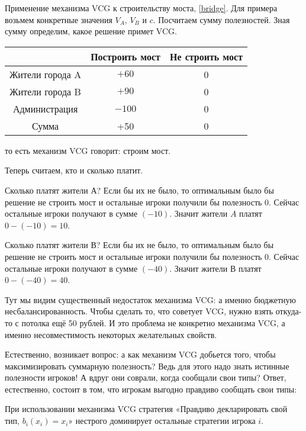 \begin{myex}
Применение механизма VCG к строительству моста, \ref{bridge}. Для примера возьмем конкретные значения $ V_{A} $, $ V_{B} $ и $ c $. Посчитаем сумму полезностей. Зная сумму определим, какое решение примет VCG.

\begin{tabular}{c|cc}
& Построить мост & Не строить мост \\
\hline
Жители города A & $ +60 $ & 0 \\
Жители города B & $ +90 $ & 0 \\
Администрация & $-100 $ & 0 \\
Сумма & +50 & 0 \\
\end{tabular}

то есть механизм VCG говорит: строим мост.

Теперь считаем, кто и сколько платит.

Сколько платят жители А? Если бы их не было, то оптимальным было бы решение не строить мост и остальные игроки получили бы полезность 0. Сейчас остальные игроки получают в сумме $ (-10) $. Значит жители $ A $ платят $ 0-(-10)=10 $.

Сколько платят жители В? Если бы их не было, то оптимальным было бы решение не строить мост и остальные игроки получили бы полезность 0. Сейчас остальные игроки получают в сумме $ (-40) $. Значит жители В платят $ 0-(-40)=40 $.

Тут мы видим существенный недостаток механизма VCG: а именно бюджетную несбалансированность. Чтобы сделать то, что советует VCG, нужно взять откуда-то с потолка ещё 50 рублей. И это проблема не конкретно механизма VCG, а именно несовместимость некоторых желательных свойств.
\end{myex}


Естественно, возникает вопрос: а как механизм VCG добьется того, чтобы максимизировать суммарную полезность? Ведь для этого надо знать истинные полезности игроков! А вдруг они соврали, когда сообщали свои типы? Ответ, естественно, состоит в том, что игрокам выгодно правдиво сообщать свои типы:

\begin{myth}
При использовании механизма VCG стратегия «Правдиво декларировать свой тип, $ b_{i}(x_{i})=x_{i} $» нестрого доминирует остальные стратегии игрока $ i $.
\end{myth}


